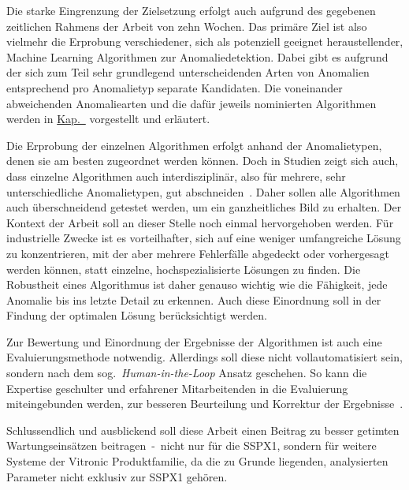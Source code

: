 Die starke Eingrenzung der Zielsetzung erfolgt auch aufgrund des gegebenen zeitlichen Rahmens der Arbeit von zehn Wochen. Das primäre
Ziel ist also vielmehr die Erprobung verschiedener, sich als potenziell geeignet heraustellender, Machine Learning Algorithmen zur
Anomaliedetektion. Dabei gibt es aufgrund der sich zum Teil sehr grundlegend unterscheidenden Arten von Anomalien entsprechend pro
Anomalietyp separate Kandidaten. Die voneinander abweichenden Anomaliearten und die dafür jeweils nominierten Algorithmen werden in
\hyperref[ch:anomaliedetektion]{Kap.~} vorgestellt und erläutert.

Die Erprobung der einzelnen Algorithmen erfolgt anhand der Anomalietypen, denen sie am besten zugeordnet werden können. Doch in
Studien zeigt sich auch, dass einzelne Algorithmen auch interdisziplinär, also für mehrere, sehr unterschiedliche Anomalietypen, gut
abschneiden~\cite{Schmidl2022}. Daher sollen alle Algorithmen auch überschneidend getestet werden, um ein ganzheitliches Bild zu erhalten.
Der Kontext der Arbeit soll an dieser Stelle noch einmal hervorgehoben werden. Für industrielle Zwecke ist es vorteilhafter, sich auf eine
weniger umfangreiche Lösung zu konzentrieren, mit der aber mehrere Fehlerfälle abgedeckt oder vorhergesagt werden können, statt einzelne,
hochspezialisierte Lösungen zu finden. Die Robustheit eines Algorithmus ist daher genauso wichtig wie die Fähigkeit, jede Anomalie bis
ins letzte Detail zu erkennen. Auch diese Einordnung soll in der Findung der optimalen Lösung berücksichtigt werden.

Zur Bewertung und Einordnung der Ergebnisse der Algorithmen ist auch eine Evaluierungsmethode notwendig. Allerdings soll diese nicht
vollautomatisiert sein, sondern nach dem sog.~\textit{Human-in-the-Loop} Ansatz geschehen. So kann die Expertise geschulter und
erfahrener Mitarbeitenden in die Evaluierung miteingebunden werden, zur besseren Beurteilung und Korrektur der Ergebnisse~\cite{Deng2024}.

Schlussendlich und ausblickend soll diese Arbeit einen Beitrag zu besser getimten Wartungseinsätzen beitragen~-~nicht nur für die SSPX1,
sondern für weitere Systeme der Vitronic Produktfamilie, da die zu Grunde liegenden, analysierten Parameter nicht exklusiv zur SSPX1 gehören.